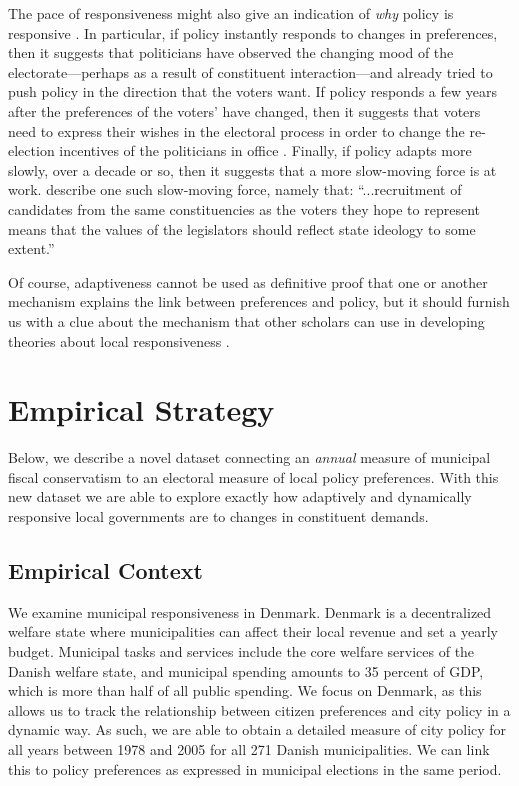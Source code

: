 \documentclass[a4paper,12pt]{article}
\begin{document}
The pace of responsiveness might also give an indication of \textit{why} policy is responsive \citep{tausanovitch2019subnational}. In particular, if policy instantly responds to changes in preferences, then it suggests that politicians have observed the changing mood of the electorate---perhaps as a result of constituent interaction---and already tried to push policy in the direction that the voters want. If policy responds a few years after the preferences of the voters' have changed, then it suggests that voters need to express their wishes in the electoral process in order to change the re-election incentives of the politicians in office \citep[e.g.,][]{boyne2009democracy}. Finally, if policy adapts more slowly, over a decade or so, then it suggests that a more slow-moving force is at work. \citet[][90]{erikson1993statehouse} describe one such slow-moving force, namely that: ``...recruitment of candidates from the same constituencies as  the voters they hope to represent means that the values of the legislators should reflect state ideology to some extent.''

Of course, adaptiveness cannot be used as definitive proof that one or another mechanism explains the link between preferences and policy, but it should furnish us with a clue about the mechanism that other scholars can use in developing theories about local responsiveness \citep{tausanovitch2019subnational}.

\section*{Empirical Strategy}
Below, we describe a novel dataset connecting an \textit{annual} measure of municipal fiscal conservatism to an electoral measure of local policy preferences. With this new dataset we are able to explore exactly how adaptively and dynamically responsive local governments are to changes in constituent demands.

\subsection*{Empirical Context}
We examine municipal responsiveness in Denmark. Denmark is a decentralized welfare state where municipalities can affect their local revenue and set a yearly budget.  Municipal tasks and services include the core welfare services of the Danish welfare state, and municipal spending amounts to 35 percent of GDP, which is more than half of all public spending. We focus on Denmark, as this allows us to track the relationship between citizen preferences and city policy in a dynamic way. As such, we are able to obtain a detailed measure of city policy for all years between 1978 and 2005 for all 271 Danish municipalities.  We can link this to policy preferences as expressed in municipal elections in the same period.
 
\end{document}
